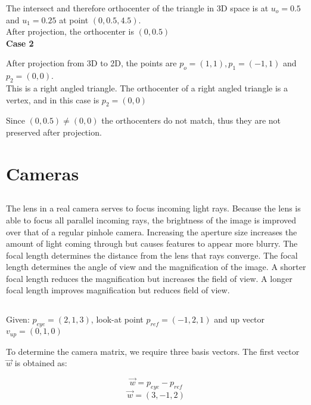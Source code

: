 \documentclass[a4paper,10pt]{scrartcl}
\begin{document}
The intersect and therefore orthocenter of the triangle in 3D space is at $u_o = 0.5$ and $u_1 = 0.25$
at point $(0, 0.5, 4.5)$.\\

After projection, the orthocenter is $(0, 0.5)$\\

{\bfseries Case 2}

After projection from 3D to 2D, the points are $p_o = (1, 1), p_1 = (-1, 1)$ and $p_2 = (0, 0)$.\\

This is a right angled triangle. The orthocenter of a right angled triangle is a vertex, and in this case is $p_2 = (0,0)$

Since $(0, 0.5) \ne (0, 0)$ the orthocenters do not match, thus they are not preserved after projection.

\section{Cameras}

\subsection{}

The lens in a real camera serves to focus incoming light rays. Because the lens is able to focus
all parallel incoming rays, the brightness of the image is improved over that of a regular pinhole camera.
Increasing the aperture size increases the amount of light coming through but causes features to appear more blurry.
The focal length determines the distance from the lens that rays converge. The focal length determines
the angle of view and the magnification of the image. A shorter focal length reduces the magnification but
increases the field of view. A longer focal length improves magnification but reduces field of view.

\subsection{}

Given: $p_{eye} = (2, 1, 3)$, look-at point $p_{ref} = (-1, 2, 1)$ and up vector $v_{up} = (0, 1, 0)$

To determine the camera matrix, we require three basis vectors. The first vector $\vec w$ is obtained
as: 

\[ \vec w = p_{eye} - p_{ref}\]
\[ \vec w = (3, -1, 2)\]
\end{document}

